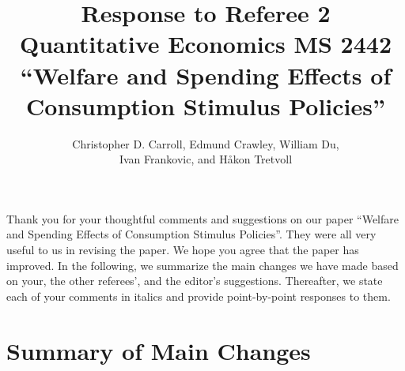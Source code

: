 \documentclass[12pt,letterpaper,english]{article}
\title{\textbf{Response to Referee 2\\ Quantitative Economics MS 2442 \\``Welfare and Spending Effects of \\ Consumption Stimulus Policies''}}
\author{Christopher D. Carroll, Edmund Crawley, William Du, \\ Ivan Frankovic, and H\aa kon Tretvoll}
\date{}
\begin{document}
\onehalfspacing
\maketitle
	
\noindent Thank you for your thoughtful comments and suggestions on our paper ``Welfare and Spending Effects of Consumption Stimulus Policies''. They were all very useful to us in revising the paper. We hope you agree that the paper has improved. In the following, we summarize the main changes we have made based on your, the other referees', and the editor's suggestions. Thereafter, we state each of your comments in italics and provide point-by-point responses to them.
	
\section{Summary of Main Changes}



\newpage 
	
\end{document}
